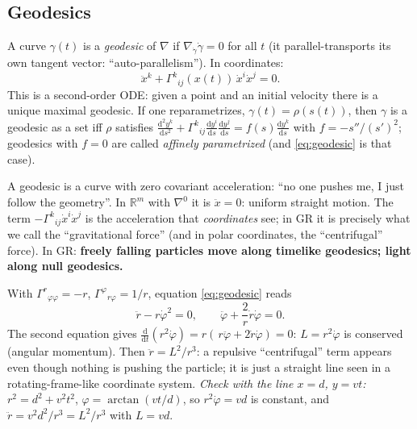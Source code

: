 \documentclass[11pt,a4paper]{article}
\numberwithin{equation}{section}
\theoremstyle{definition}
\theoremstyle{plain}
\newcommand{\R}{\mathbb{R}}
\newcommand{\dd}{\mathrm{d}}
\begin{document}
\subsection{Geodesics}
\begin{formal}[{geodesic}]
A curve $\gamma(t)$ is a \emph{geodesic} of $\nabla$ if $\nabla_{\dot\gamma}\dot\gamma=0$ for all $t$ (it parallel-transports its own tangent vector: ``auto-parallelism''). In coordinates:
\begin{equation}\label{eq:geodesic}
\ddot x^k+\Gamma^k{}_{ij}(x(t))\,\dot x^i\dot x^j=0 .
\end{equation}
This is a second-order ODE: given a point and an initial velocity there is a unique maximal geodesic. If one reparametrizes, $\gamma(t)=\rho(s(t))$, then $\gamma$ is a geodesic as a set iff $\rho$ satisfies $\frac{\dd^2y^k}{\dd s^2}+\Gamma^k{}_{ij}\frac{\dd y^i}{\dd s}\frac{\dd y^j}{\dd s}=f(s)\frac{\dd y^k}{\dd s}$ with $f=-s''/(s')^2$; geodesics with $f=0$ are called \emph{affinely parametrized} (and \eqref{eq:geodesic} is that case).
\end{formal}
\begin{intuition}
A geodesic is a curve with zero covariant acceleration: ``no one pushes me, I just follow the geometry''. In $\R^m$ with $\nabla^0$ it is $\ddot x=0$: uniform straight motion. The term $-\Gamma^k{}_{ij}\dot x^i\dot x^j$ is the acceleration that \emph{coordinates} see; in GR it is precisely what we call the ``gravitational force'' (and in polar coordinates, the ``centrifugal'' force). In GR: \textbf{freely falling particles move along timelike geodesics; light along null geodesics.}
\end{intuition}

\begin{example}
With $\Gamma^r{}_{\varphi\varphi}=-r$, $\Gamma^\varphi{}_{r\varphi}=1/r$, equation \eqref{eq:geodesic} reads
\[
\ddot r-r\dot\varphi^2=0,\qquad \ddot\varphi+\frac2r\dot r\dot\varphi=0 .
\]
The second equation gives $\frac{\dd}{\dd t}(r^2\dot\varphi)=r(\,r\ddot\varphi+2\dot r\dot\varphi)=0$: $L=r^2\dot\varphi$ is conserved (angular momentum). Then $\ddot r=L^2/r^3$: a repulsive ``centrifugal'' term appears even though nothing is pushing the particle; it is just a straight line seen in a rotating-frame-like coordinate system. \emph{Check with the line $x=d$, $y=vt$:} $r^2=d^2+v^2t^2$, $\varphi=\arctan(vt/d)$, so $r^2\dot\varphi=vd$ is constant, and $\ddot r=v^2d^2/r^3=L^2/r^3$ with $L=vd$. \checkmark
\end{example}
\end{document}
